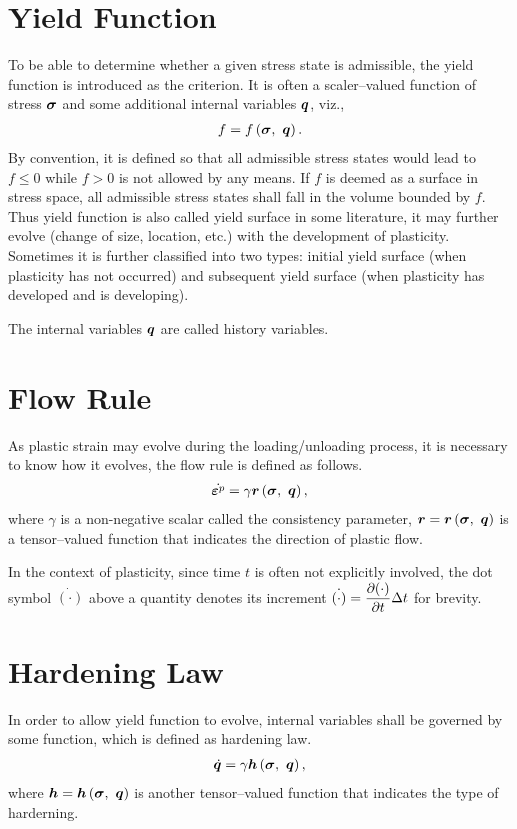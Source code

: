 \section{Yield Function}
To be able to determine whether a given stress state is admissible, the yield function is introduced as the criterion. It is often a scaler--valued function of stress $\bm{\sigma}$ and some additional internal variables $\bm{q}$, viz.,
\begin{gather}
f=f\left(\bm{\sigma},~\bm{q}\right).
\end{gather}
By convention, it is defined so that all admissible stress states would lead to $f\leqslant0$ while $f>0$ is not allowed by any means. If $f$ is deemed as a surface in stress space, all admissible stress states shall fall in the volume bounded by $f$. Thus yield function is also called yield surface in some literature, it may further evolve (change of size, location, etc.) with the development of plasticity. Sometimes it is further classified into two types: initial yield surface (when plasticity has not occurred) and subsequent yield surface (when plasticity has developed and is developing).

The internal variables $\bm{q}$ are called history variables.
\section{Flow Rule}
As plastic strain may evolve during the loading/unloading process, it is necessary to know how it evolves, the flow rule is defined as follows.
\begin{gather}
\dot{\bm{\varepsilon}^p}=\gamma\bm{r}\left(\bm{\sigma},~\bm{q}\right),
\end{gather}
where $\gamma$ is a non-negative scalar called the consistency parameter, $\bm{r}=\bm{r}\left(\bm{\sigma},~\bm{q}\right)$ is a tensor--valued function that indicates the direction of plastic flow.

In the context of plasticity, since time $t$ is often not explicitly involved, the dot symbol $\dot{\left(\cdot\right)}$ above a quantity denotes its increment $\dot{\left(\cdot\right)}=\dfrac{\partial{\left(\cdot\right)}}{\partial{t}}\Delta{}t$ for brevity.
\section{Hardening Law}
In order to allow yield function to evolve, internal variables shall be governed by some function, which is defined as hardening law.
\begin{gather}
\dot{\bm{q}}=\gamma\bm{h}\left(\bm{\sigma},~\bm{q}\right),
\end{gather}
where $\bm{h}=\bm{h}\left(\bm{\sigma},~\bm{q}\right)$ is another tensor--valued function that indicates the type of harderning.
